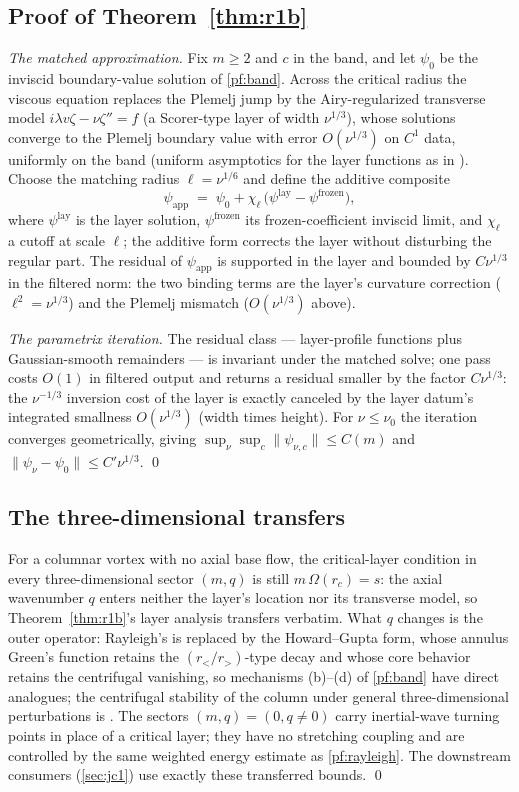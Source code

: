 \documentclass[11pt,letterpaper]{amsart}
\theoremstyle{definition}
\theoremstyle{remark}
\newcommand{\norm}[1]{\lVert #1 \rVert}
\begin{document}
\subsection{Proof of Theorem~\ref{thm:r1b}}\label{pf:r1b}
\emph{The matched approximation.} Fix $m\ge2$ and $c$ in the band, and let $\psi_0$ be
the inviscid boundary-value solution of \cref{pf:band}. Across the critical radius the
viscous equation replaces the Plemelj jump by the Airy-regularized transverse model
$i\lambda v\zeta-\nu\zeta''=f$ (a Scorer-type layer of width $\nu^{1/3}$), whose
solutions converge to the Plemelj boundary value with error $O(\nu^{1/3})$ on $C^1$
data, uniformly on the band (uniform asymptotics for the layer functions as in
\cite{Olver1974}). Choose the matching radius $\ell=\nu^{1/6}$ and define the additive
composite
\[
\psi_{\mathrm{app}}\;=\;\psi_0+\chi_\ell\,\bigl(\psi^{\mathrm{lay}}-\psi^{\mathrm{frozen}}\bigr),
\]
where $\psi^{\mathrm{lay}}$ is the layer solution, $\psi^{\mathrm{frozen}}$ its
frozen-coefficient inviscid limit, and $\chi_\ell$ a cutoff at scale $\ell$; the
additive form corrects the layer without disturbing the regular part. The residual of
$\psi_{\mathrm{app}}$ is supported in the layer and bounded by
$C\nu^{1/3}$ in the filtered norm: the two binding terms are the layer's curvature
correction ($\ell^2=\nu^{1/3}$) and the Plemelj mismatch ($O(\nu^{1/3})$ above).

\emph{The parametrix iteration.} The residual class --- layer-profile functions plus
Gaussian-smooth remainders --- is invariant under the matched solve; one pass costs
$O(1)$ in filtered output and returns a residual smaller by the factor $C\nu^{1/3}$:
the $\nu^{-1/3}$ inversion cost of the layer is exactly canceled by the layer datum's
integrated smallness $O(\nu^{1/3})$ (width times height). For $\nu\le\nu_0$ the
iteration converges geometrically, giving
$\sup_\nu\sup_c\norm{\psi_{\nu,c}}\le C(m)$ and
$\norm{\psi_\nu-\psi_0}\le C'\nu^{1/3}$. \qed

\subsection{The three-dimensional transfers}\label{pf:threed}
For a columnar vortex with no axial base flow, the critical-layer condition in every
three-dimensional sector $(m,q)$ is still $m\,\Omega(r_c)=s$: the axial wavenumber $q$
enters neither the layer's location nor its transverse model, so
Theorem~\ref{thm:r1b}'s layer analysis transfers verbatim. What $q$ changes is the
outer operator: Rayleigh's is replaced by the Howard--Gupta form, whose annulus
Green's function retains the $(r_</r_>)$-type decay and whose core behavior retains
the centrifugal vanishing, so mechanisms (b)--(d) of \cref{pf:band} have direct
analogues; the centrifugal stability of the column under general three-dimensional
perturbations is \cite{GallaySmets2020}. The sectors $(m,q)=(0,q\neq0)$ carry
inertial-wave turning points in place of a critical layer; they have no stretching
coupling and are controlled by the same weighted energy estimate as
\cref{pf:rayleigh}. The downstream consumers (\cref{sec:jc1}) use exactly these
transferred bounds. \qed
\end{document}
